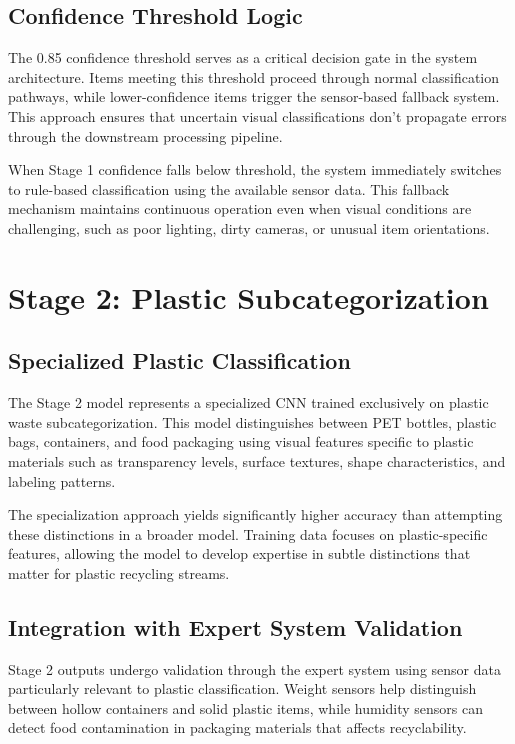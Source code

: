 \documentclass[11pt, a4paper]{article}
\begin{document}
\subsection{Confidence Threshold Logic}
The 0.85 confidence threshold serves as a critical decision gate in the system architecture. Items meeting this threshold proceed through normal classification pathways, while lower-confidence items trigger the sensor-based fallback system. This approach ensures that uncertain visual classifications don't propagate errors through the downstream processing pipeline.

When Stage 1 confidence falls below threshold, the system immediately switches to rule-based classification using the available sensor data. This fallback mechanism maintains continuous operation even when visual conditions are challenging, such as poor lighting, dirty cameras, or unusual item orientations.

\section{Stage 2: Plastic Subcategorization}

\subsection{Specialized Plastic Classification}
The Stage 2 model represents a specialized CNN trained exclusively on plastic waste subcategorization. This model distinguishes between PET bottles, plastic bags, containers, and food packaging using visual features specific to plastic materials such as transparency levels, surface textures, shape characteristics, and labeling patterns.

The specialization approach yields significantly higher accuracy than attempting these distinctions in a broader model. Training data focuses on plastic-specific features, allowing the model to develop expertise in subtle distinctions that matter for plastic recycling streams.

\subsection{Integration with Expert System Validation}
Stage 2 outputs undergo validation through the expert system using sensor data particularly relevant to plastic classification. Weight sensors help distinguish between hollow containers and solid plastic items, while humidity sensors can detect food contamination in packaging materials that affects recyclability.
\end{document}
